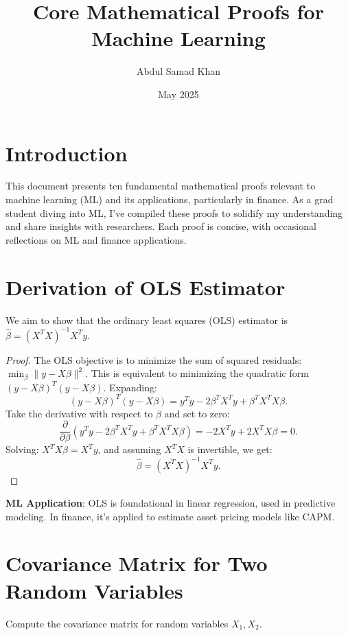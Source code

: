 \documentclass{article}
\title{Core Mathematical Proofs for Machine Learning}
\author{Abdul Samad Khan}
\date{May 2025}
\theoremstyle{plain}
\theoremstyle{definition}
\newtheorem{proof}
\begin{document}
\maketitle

\section*{Introduction}
This document presents ten fundamental mathematical proofs relevant to machine learning (ML) and its applications, particularly in finance. As a grad student diving into ML, I’ve compiled these proofs to solidify my understanding and share insights with researchers. Each proof is concise, with occasional reflections on ML and finance applications.

\section{Derivation of OLS Estimator}
We aim to show that the ordinary least squares (OLS) estimator is $\hat{\beta} = (X^T X)^{-1} X^T y$.

\begin{proof}
The OLS objective is to minimize the sum of squared residuals: $\min_{\beta} \| y - X\beta \|^2$. This is equivalent to minimizing the quadratic form $(y - X\beta)^T (y - X\beta)$. Expanding:
\[
(y - X\beta)^T (y - X\beta) = y^T y - 2\beta^T X^T y + \beta^T X^T X \beta.
\]
Take the derivative with respect to $\beta$ and set to zero:
\[
\frac{\partial}{\partial \beta} (y^T y - 2\beta^T X^T y + \beta^T X^T X \beta) = -2X^T y + 2X^T X \beta = 0.
\]
Solving: $X^T X \beta = X^T y$, and assuming $X^T X$ is invertible, we get:
\[
\hat{\beta} = (X^T X)^{-1} X^T y.
\]
\end{proof}
\textbf{ML Application}: OLS is foundational in linear regression, used in predictive modeling. In finance, it’s applied to estimate asset pricing models like CAPM.

\section{Covariance Matrix for Two Random Variables}
Compute the covariance matrix for random variables $X_1, X_2$.
\end{document}
